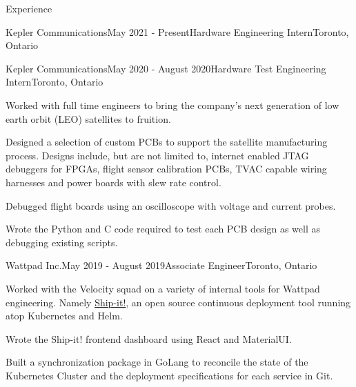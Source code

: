 \documentclass{resume} %
\begin{document}
\begin{rSection}{Experience}

\begin{rSubsection}{Kepler Communications}{May 2021 - Present}{Hardware
    Engineering Intern}{Toronto, Ontario}
\end{rSubsection}

\begin{rSubsection}{Kepler Communications}{May 2020 - August 2020}{Hardware
    Test Engineering Intern}{Toronto, Ontario}
\item Worked with full time engineers to bring the company's next generation of
  low earth orbit (LEO) satellites to fruition.
\item Designed a selection of custom PCBs to support the satellite manufacturing
  process. Designs include, but are not limited to, internet enabled JTAG
  debuggers for FPGAs, flight sensor calibration PCBs, TVAC capable wiring
  harnesses and power boards with slew rate control.
\item Debugged flight boards using an oscilloscope with voltage
  and current probes.
\item Wrote the Python and C code required to test each PCB design as well as
  debugging existing scripts.
\end{rSubsection}


\begin{rSubsection}{Wattpad Inc.}{May 2019 - August 2019}{Associate
    Engineer}{Toronto, Ontario}
\item Worked with the Velocity squad on a variety of internal tools for Wattpad engineering.
  Namely \href{https://github.com/Wattpad/ship-it}{Ship-it!}, an open source continuous deployment tool running atop Kubernetes and
  Helm.
\item Wrote the Ship-it! frontend dashboard using React and MaterialUI.
\item Built a synchronization package in GoLang to reconcile the state of the
  Kubernetes Cluster and the deployment specifications for each service in Git.
\end{rSubsection}



\end{rSection}
\end{document}

